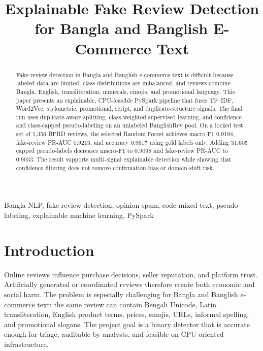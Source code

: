 \documentclass[conference]{IEEEtran}
\begin{document}
\title{Explainable Fake Review Detection for Bangla and Banglish E-Commerce Text}

\author{
}

\maketitle

\begin{abstract}
Fake-review detection in Bangla and Banglish e-commerce text is difficult because labeled data are limited, class distributions are imbalanced, and reviews combine Bangla, English, transliteration, numerals, emojis, and promotional language. This paper presents an explainable, CPU-feasible PySpark pipeline that fuses TF--IDF, Word2Vec, stylometric, promotional, script, and duplicate-structure signals. The final run uses duplicate-aware splitting, class-weighted supervised learning, and confidence- and class-capped pseudo-labeling on an unlabeled BanglishRev pool. On a locked test set of 1,356 BFRD reviews, the selected Random Forest achieves macro-F1 0.9194, fake-review PR-AUC 0.9213, and accuracy 0.9617 using gold labels only. Adding 31,605 capped pseudo-labels decreases macro-F1 to 0.9098 and fake-review PR-AUC to 0.9033. The result supports multi-signal explainable detection while showing that confidence filtering does not remove confirmation bias or domain-shift risk.
\end{abstract}

\begin{IEEEkeywords}
Bangla NLP, fake review detection, opinion spam, code-mixed text, pseudo-labeling, explainable machine learning, PySpark
\end{IEEEkeywords}

\section{Introduction}
Online reviews influence purchase decisions, seller reputation, and platform trust. Artificially generated or coordinated reviews therefore create both economic and social harm. The problem is especially challenging for Bangla and Banglish e-commerce text: the same review can contain Bengali Unicode, Latin transliteration, English product terms, prices, emojis, URLs, informal spelling, and promotional slogans. The project goal is a binary detector that is accurate enough for triage, auditable by analysts, and feasible on CPU-oriented infrastructure.
\end{document}
